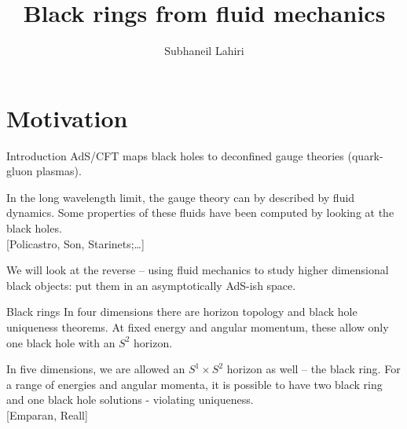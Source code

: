 \documentclass{beamer}
\title{Black rings from fluid mechanics}
\author{Subhaneil Lahiri}
\institute[Harvard]{%
based on \texttt{arXiv:0705.3404 [hep-th]} with Shiraz Minwalla \\
 and work in progress with Jyotirmoy Bhattacharya
}
\newcommand{\rref}[1]{\hfill \small{\color{darkgrey} [#1]}}
\begin{document}

\begin{frame}
%
 \titlepage
%
\end{frame}

\section{Motivation}


\begin{frame}{Introduction}
%
 AdS/CFT maps black holes to deconfined gauge theories (quark-gluon plasmas).

 \vp In the long wavelength limit, the gauge theory can by described by fluid dynamics. Some properties of these fluids have been computed by looking at the black holes.\\ \rref{Policastro, Son, Starinets;\ldots}

 \vp We will look at the reverse -- using fluid mechanics to study higher dimensional black objects: put them in an asymptotically AdS-ish space.

%
\end{frame}


%
%


\begin{frame}{Black rings}
%
 In four dimensions there are horizon topology and black hole uniqueness theorems. At fixed energy and angular momentum, these allow only one black hole with an $S^2$ horizon.

 \vp In five dimensions, we are allowed an $S^1 \times S^2$ horizon as well -- \alert{the black ring}. For a range of energies and angular momenta, it is possible to have two black ring and one black hole solutions - violating uniqueness.
 \\ \rref{Emparan, Reall}

 \begin{center}
   
 \end{center}
%
\end{frame}
\end{document}
